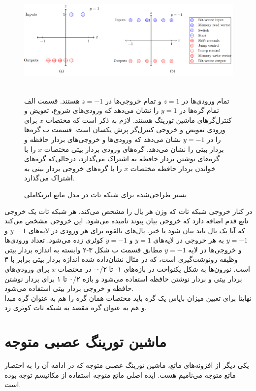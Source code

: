 \begin{figure}[!h]
\begin{center}
\includegraphics[height=5cm]{HyperENTM-Substrate.png}
\end{center}
\caption{بستر طراحی‌شده برای شبکه تات در مدل ماتع ابرتکاملی\cite{merrild2018hyperntm} }
\medskip
\small
تمام ورودی‌ها در $z=1$ و تمام خروجی‌ها در $z=-1$ هستند. قسمت الف تمام گره‌ها در $y=1$ را نشان می‌دهد که ورودی‌های شروع، تعویض و کنترل‌‌گرهای ماشین تورینگ هستند. لازم به ذکر است که مختصات $x$ برای ورودی تعویض و خروجی کنترل‌گر پرش یکسان است.
قسمت ب گره‌ها را در $y=-1‌$ نشان می‌دهد که ورودی‌ها و خروجی‌های بردار حافظه و بردار بیتی را نشان می‌دهد. گره‌های ورودی بردار بیتی مختصات $x$ را با گره‌های نوشتن بردار حافظه به اشتراک می‌گذارد، درحالی‌که گره‌های خواندن بردار حافظه مختصات $x$ را با گره‌های خروجی بردار بیتی به اشتراک می‌گذارد.\cite{merrild2018hyperntm}
\end{figure}

در کنار خروجی شبکه تات که وزن هر یال را مشخص می‌کند، هر شبکه تات یک خروجی تابع قدم اضافه دارد که خروجی بیان پیوند نامیده می‌شود. این خروجی مشخص می‌کند که آیا یک یال باید بیان شود یا خیر. یال‌های بالقوه برای هر ورودی در لایه‌های $y=1$ و $y=-1$ به هر خروجی در لایه‌های $y=1$ و $y=-1‌$ کوئری زده می‌شود. تعداد ورودی‌ها و خروجی‌ها در لایه $y=-1$ مطابق قسمت ب شکل ۳-۲ وابسته به اندازه بردار بیتی وظیفه رونوشت‌گیری است، که در مثال نشان‌داده شده اندازه بردار بیتی برابر با ۳ است. نورون‌ها به شکل یکنواخت در بازه‌های ۱- تا ۰/۲- در مختصات $x$ برای ورودی‌های بردار بیتی و بردار نوشتن حافظه استفاده می‌شود و بازه ۰/۲ تا ۱ برای بردار نوشتن حافظه و خروجی بردار بیتی استفاده می‌شود.\cite{merrild2018hyperntm} 
\\

نهایتا برای تعیین میزان بایاس یک گره باید مختصات همان گره را هم به عنوان گره مبدا و هم به عنوان گره مقصد به شبکه تات کوئری زد.\cite{merrild2018hyperntm}

\section{ماشین تورینگ عصبی متوجه}
یکی دیگر از افزونه‌های ماتع، ماشین تورینگ عصبی متوجه که در ادامه آن را به اختصار ماتع متوجه می‌نامیم هست. ایده اصلی ماتع متوجه استفاده از مکانیسم توجه بوده است.
\\

